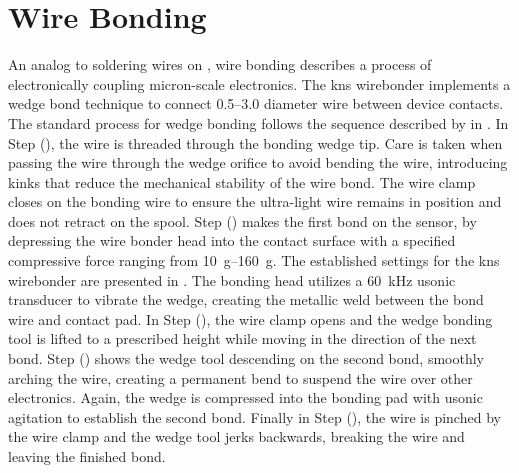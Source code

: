 \documentclass[../../main.tex]{subfiles}
\begin{document}
%
    \section{Wire Bonding}%
    \label{app:thin-film-processing:wire-bonding}%
    An analog to soldering wires on , wire bonding describes a process of electronically coupling micron-scale electronics. 
    The \gls{kns} \gls{wirebonder} implements a wedge bond technique to connect \SIrange{0.5}{3.0}{\mil} diameter wire between device contacts.
    The standard process for wedge bonding follows the sequence described by \citeauthor*{Fischer_2013} in  \cite{Fischer_2013}.
    In Step (), the wire is threaded through the bonding wedge tip.
    Care is taken when passing the wire through the wedge orifice to avoid bending the wire, introducing kinks that reduce the mechanical stability of the wire bond.
    The wire clamp closes on the bonding wire to ensure the ultra-light wire remains in position and does not retract on the spool.
    Step () makes the first bond on the sensor, by depressing the wire bonder head into the contact surface with a specified compressive force ranging from \SIrange{10}{160}{\gram}.
    The established settings for the \gls{kns} \gls{wirebonder} are presented in . 
    The bonding head utilizes a \SI{60}{\kilo\hertz} \gls{usonic} transducer to vibrate the wedge, creating the metallic weld between the bond wire and contact pad.
    In Step (), the wire clamp opens and the wedge bonding tool is lifted to a prescribed height while moving in the direction of the next bond.
    Step () shows the wedge tool descending on the second bond, smoothly arching the wire, creating a permanent bend to suspend the wire over other electronics.
    Again, the wedge is compressed into the bonding pad with \gls{usonic} agitation to establish the second bond.
    Finally in Step (), the wire is pinched by the wire clamp and the wedge tool jerks backwards, breaking the wire and leaving the finished bond.
    \par%
\end{document}
